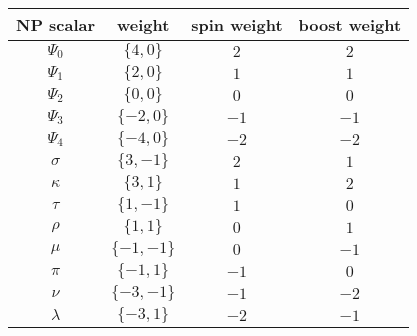 \documentclass[12pt]{report}
\begin{document}
\begin{center}
\begin{tabular}{ c c c c }
\hline
 NP scalar & weight &  spin weight &  boost weight \\ 
\hline
$\Psi_0$ 	& $\{ 4, 0\}$ & $ 2$  & $ 2$ \\
$\Psi_1$ 	& $\{ 2, 0\}$ & $ 1$  & $ 1$ \\
$\Psi_2$ 	& $\{ 0, 0\}$ & $ 0$  & $ 0$ \\
$\Psi_3$ 	& $\{-2, 0\}$ & $-1$ & $-1$ \\
$\Psi_4$ 	& $\{-4, 0\}$ & $-2$ & $-2$ \\ 
$\sigma$ 	& $\{ 3,-1\}$ & $ 2$ & $ 1$ \\ 
$\kappa$ 	& $\{ 3, 1\}$ & $ 1$ & $ 2$ \\ 
$\tau$ 		& $\{ 1,-1\}$ & $ 1$ & $ 0$ \\ 
$\rho$ 		& $\{ 1, 1\}$ & $ 0$ & $ 1$ \\ 
$\mu$ 		& $\{-1,-1\}$ & $ 0$ & $-1$ \\ 
$\pi$ 		& $\{-1, 1\}$ & $-1$ & $ 0$ \\ 
$\nu$ 		& $\{-3,-1\}$ & $-1$ & $-2$ \\ 
$\lambda$ 	& $\{-3, 1\}$ & $-2$ & $-1$ \\ 
\end{tabular}
\end{center}
\end{document}
